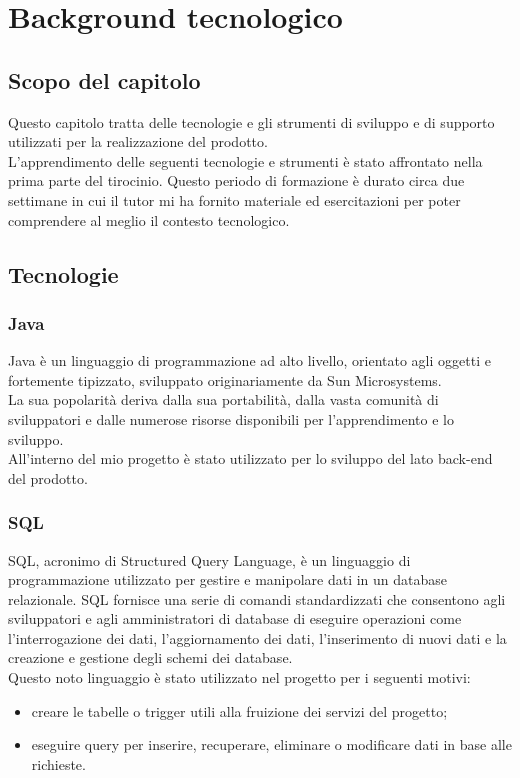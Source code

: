 \chapter{Background tecnologico}
\label{cap:tecnologie}

\section{Scopo del capitolo}
Questo capitolo tratta delle tecnologie e gli strumenti di sviluppo e di supporto utilizzati per la realizzazione del prodotto.\\ L'apprendimento delle seguenti tecnologie e strumenti è stato affrontato nella prima parte del tirocinio. Questo periodo di formazione è durato circa due settimane in cui il tutor mi ha fornito materiale ed esercitazioni per poter comprendere al meglio il contesto tecnologico.\\

\section{Tecnologie}
\subsection*{Java}
Java è un linguaggio di programmazione ad alto livello, orientato agli oggetti e fortemente tipizzato, sviluppato originariamente da Sun Microsystems.\\
La sua popolarità deriva dalla sua portabilità, dalla vasta comunità di sviluppatori e dalle numerose risorse disponibili per l'apprendimento e lo sviluppo.\\
All'interno del mio progetto è stato utilizzato per lo sviluppo del lato back-end del prodotto. 
\\

\subsection*{SQL}
SQL, acronimo di Structured Query Language, è un linguaggio di programmazione utilizzato per gestire e manipolare dati in un database relazionale. SQL fornisce una serie di comandi standardizzati che consentono agli sviluppatori e agli amministratori di database di eseguire operazioni come l'interrogazione dei dati, l'aggiornamento dei dati, l'inserimento di nuovi dati e la creazione e gestione degli schemi dei database.\\
Questo noto linguaggio è stato utilizzato nel progetto per i seguenti motivi:
\begin{itemize}
\item creare le tabelle o trigger utili alla fruizione dei servizi del progetto;
\item eseguire query per inserire, recuperare, eliminare o modificare dati in base alle richieste.
\end{itemize}

